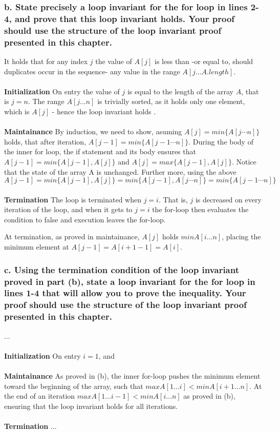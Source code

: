 \documentclass[11pt,english]{article}
\begin{document}
\subsubsection*{b. \mdseries State precisely a loop invariant for the
\textbf{for} loop in lines 2-4, and prove that this loop invariant holds. Your
proof should use the structure of the loop invariant proof presented in this
chapter.}
It holds that for any index $j$ the value of $A[j]$ is less than -or equal to,
should duplicates occur in the sequence- any value in the range
$A[j \dots A.length]$.
\\\\
\textbf{Initialization} \mdseries On entry the value of $j$ is equal to the
length of the array $A$, that is $j = n$. The range $A[j \dots n]$ is
trivially sorted, as it holds only one element, which is $A[j]$ - hence the
loop invariant holds .
\\\\
\textbf{Maintainance} \mdseries By induction, we need to show, asuming
$A[j] = min\{A[j \cdots n]\}$ holds, that after iteration, $A[j-1] = min\{
A[j-1 \cdots n]\}$. During the body of the inner for loop, the if
statement and its body ensures that $A[j-1] = min\{A[j-1],A[j]\}$ and $A[j] 
= max\{A[j-1],A[j]\}$. Notice that the state of the array A is unchanged.
Further more, using the above $A[j-1] = min\{A[j-1],A[j]\} = min\{A[j-1],
A[j \cdots n]\} = min\{A[j-1 \cdots n]\}$
\\\\
\textbf{Termination} \mdseries The loop is terminated when $j = i$. That is,
$j$ is decreased on every iteration of the loop, and when it gets to
$j = i$ the for-loop then evaluates the condition to false and execution
leaves the for-loop.

At termination, as proved in maintainance, $A[j]$ holds
$min{A[i \dots n]}$, placing the minimum element at
$A[j - 1] = A[i + 1 - 1] = A[i]$.

\subsubsection*{c. \mdseries Using the termination condition of the loop
invariant proved in part (b), state a loop invariant for the \textbf{for} loop
in lines 1-4 that will allow you to prove the inequality. Your proof should
use the structure of the loop invariant proof presented in this chapter.}
...
\\\\
\textbf{Initialization} \mdseries On entry $i = 1$, and 
\\\\
\textbf{Maintainance} \mdseries As proved in (b), the inner for-loop pushes
the minimum element toward the beginning of the array, such that
$max{A[1 \dots i]} < min{A[i + 1 \dots n]}$. At the end of an iteration
$max{A[1 \dots i - 1]} < min{A[i \dots n]}$ as proved in (b), ensuring that
the loop invariant holds for all iterations.
\\\\
\textbf{Termination} \mdseries ...
\end{document}
